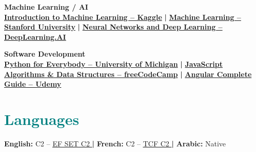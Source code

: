 \documentclass[11pt]{article}
\newcommand{\LanguagesSection}[0]{\section*{\textcolor{teal}{Languages}}}
\begin{document}
\textbf{Machine Learning / AI} \\
\href{https://www.kaggle.com/learn/intro-to-machine-learning}{\textbf{Introduction to Machine Learning – Kaggle}} \textbf{ | }
\href{https://www.coursera.org/learn/machine-learning}{\textbf{Machine Learning – Stanford University}} \textbf{ | }
\href{https://www.coursera.org/learn/neural-networks-deep-learning}{\textbf{Neural Networks and Deep Learning – DeepLearning.AI}}
\vspace{0.2cm}

\textbf{Software Development} \\
\href{https://www.coursera.org/specializations/python}{\textbf{Python for Everybody – University of Michigan}} \textbf{ | }
\href{https://www.freecodecamp.org/learn/javascript-algorithms-and-data-structures/}{\textbf{JavaScript Algorithms \& Data Structures – freeCodeCamp}} \textbf{ | }
\href{https://www.udemy.com/course/angular-complete-guide/}{\textbf{Angular Complete Guide – Udemy}} 

\LanguagesSection
\textbf{English:} C2 – \href{https://cert.efset.org/6YsT6y}{\underline{EF SET C2} \faLink} \textbf{ | }
\textbf{French:} C2 – \href{https://drive.google.com/file/d/1yojzT_8XB7gIulaIKh8TSYeOl8NBXxpR/view}{\underline{TCF C2} \faLink} \textbf{ | }
\textbf{Arabic:} Native

\vspace{-0.3cm}
\end{document}
